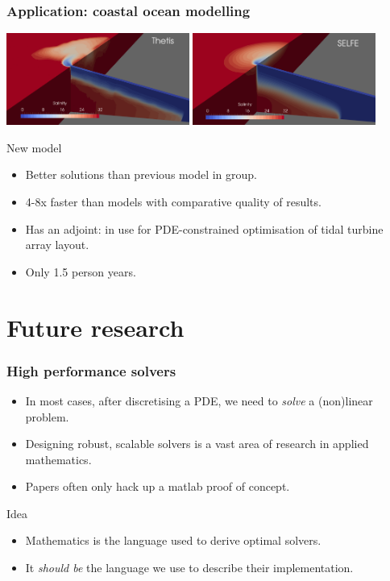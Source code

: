 \documentclass[presentation]{beamer}
\begin{document}
\begin{frame}
  \frametitle{Application: coastal ocean modelling}
  \begin{center}
    \includegraphics[width=0.45\textwidth]{thetis-rhine} \hspace{1em}
    \includegraphics[width=0.45\textwidth]{selfe-rhine}
  \end{center}
  \begin{block}{New model}
    \begin{itemize}
    \item Better solutions than previous model in group.
    \item 4-8x faster than models with comparative quality of
      results.
    \item Has an adjoint: in use for PDE-constrained optimisation of
      tidal turbine array layout.
    \item Only 1.5 person years.
    \end{itemize}
  \end{block}
\end{frame}
\section{Future research}

\begin{frame}
  \frametitle{High performance solvers}
  \begin{itemize}
  \item In most cases, after discretising a PDE, we need to
    \emph{solve} a (non)linear problem.
  \item Designing robust, scalable solvers is a vast area of research
    in applied mathematics.
  \item Papers often only hack up a matlab proof of concept.
  \end{itemize}
  \begin{block}{Idea}
    \begin{itemize}
    \item Mathematics is the language used to derive optimal solvers.

    \item It \emph{should be} the language we use to describe their implementation.
    \end{itemize}
  \end{block}
\end{frame}
\end{document}
